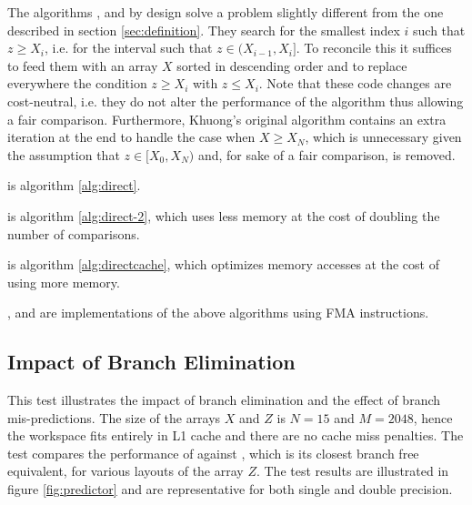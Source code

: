 \documentclass[preprint,1p,times]{elsarticle}
\newcounter{subsubsubsection}[subsubsection]
\begin{document}
The algorithms \textit{\MorinBranchyName}, \textit{\LowerBoundName} and \textit{\MorinOffsetName} by design solve a problem slightly different from the one described in section \ref{sec:definition}. They search for the smallest index $i$ such that $z \geq X_i$, i.e. for the interval such that $z \in (X_{i-1},X_i]$. To reconcile this it suffices to feed them with an array $X$ sorted in descending order and to replace everywhere the condition $z \geq X_i$ with $z \leq X_i$. Note that these code changes are cost-neutral, i.e. they do not alter the performance of the algorithm thus allowing a fair comparison. Furthermore, Khuong's original algorithm contains an extra iteration at the end to handle the case when $X \geq X_N$, which is unnecessary given the assumption that $z \in [X_0,X_N)$ and, for sake of a fair comparison, is removed.

	\begin{myitemize}
		\item \textit{\DirectName} is algorithm \ref{alg:direct}.
		\item \textit{\DirectGapName} is algorithm \ref{alg:direct-2}, which uses less memory at the cost of doubling the number of comparisons.
		\item \textit{\DirectCacheName} is algorithm \ref{alg:directcache}, which optimizes memory accesses at the cost of using more memory.
		\item \textit{\DirectFMAName}, \textit{\DirectGapFMAName} and \textit{\DirectCacheFMAName} are implementations of the above algorithms using FMA instructions.
	\end{myitemize}


\subsection{Impact of Branch Elimination}
\label{sec:testpredict}
This test illustrates the impact of branch elimination and the effect of branch mis-predictions.
The size of the arrays $X$ and $Z$ is $N=15$ and $M=2048$, hence the workspace fits entirely in L1 cache and there are no cache miss penalties. The test compares the performance of \textit{\ClassicName} against \textit{\ClassicModName}, which is its closest branch free equivalent, for various layouts of the array $Z$. The test results are illustrated in figure \ref{fig:predictor} and are representative for both single and double precision.
\end{document}
